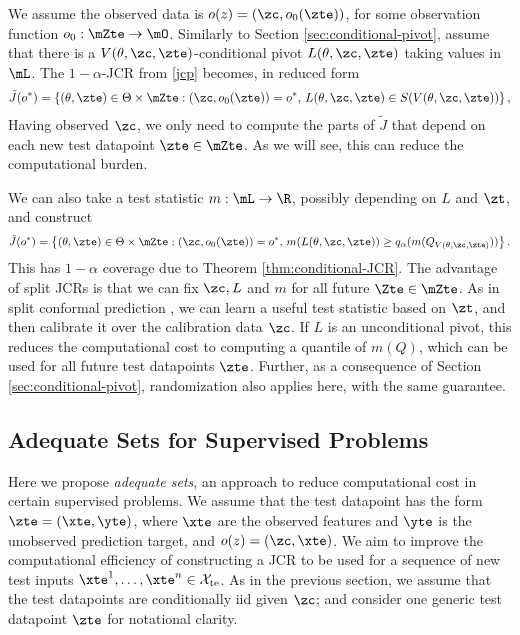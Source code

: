 \documentclass[english]{article}
\begin{document}
We assume the observed data is $o(z) = (\zc,o_0(\zte))$, for some observation function $o_0: \mZte \to \mO$. 
Similarly to Section \ref{sec:conditional-pivot},
assume that  there is a $V(\theta,\zc,\zte)$-conditional pivot $L(\theta,\zc,\zte)$ taking values in $\mL$. 
The  $1-\alpha$-JCR from \eqref{jcp} becomes, in reduced form
\begin{align}\label{redu-ind}
    \tilde J(o^*)= \left\{(\theta,\zte) 
\in\Theta\times\mZte: 
(\zc,o_0(\zte)) = o^*,\,
L(\theta,\zc,\zte) \in S(V(\theta,\zc,\zte)) \right\},
\end{align}
Having observed $\zc$, 
we only need to compute the parts of 
$\tilde J$ that depend on each new test datapoint $\zte \in \mZte$.
As we will see, this can reduce the computational burden.

We can also take a test statistic $m:\mL\to \R$, possibly depending on $L$ and $\zt$, and construct
\begin{align}\label{eq:split-test-stat}
  \tilde J(o^*)= \left\{(\theta,\zte) 
\in\Theta\times\mZte: 
(\zc,o_0(\zte)) = o^*,\,
m(L(\theta,\zc,\zte)) \ge q_{\alpha}(m(Q_{V(\theta,\zc,\zte)})) \right\}.
\end{align}
This has $1-\alpha$ coverage due to Theorem \ref{thm:conditional-JCR}.
The advantage of split JCRs is that we
can fix $\zc,L$ and
$m$ for all future $\Zte \in \mZte$.
As in  split conformal prediction \citep{papadopoulos2002inductive}, 
we can learn 
a useful test statistic based on $\zt$, and then calibrate it over
the calibration data $\zc$.
If $L$ is an unconditional pivot,
this reduces the computational cost to computing a quantile of $m(Q)$, which can be used for all future test datapoints $\zte$.
Further,
as a consequence of Section \ref{sec:conditional-pivot}, randomization also applies here, with the same guarantee.

\subsection{Adequate Sets for Supervised Problems}\label{sec:adequate-set}

Here we propose \emph{adequate sets}, an approach to reduce computational cost in certain supervised problems. 
We assume that the test datapoint has the form $\zte = (\xte,\yte)$, where $\xte$ are the observed features and $\yte$ is the unobserved prediction target, and $o(z) = (\zc,\xte)$. 
We aim to improve the computational efficiency of constructing a JCR to be used 
for a sequence of new test inputs $\xte^1, \ldots, \xte^n \in \mathcal{X}_{\mathrm{te}}$.
As in the previous section,
we assume that the test datapoints are conditionally iid given $\zc$; and consider one generic test datapoint $\zte$ for notational clarity.
\end{document}
